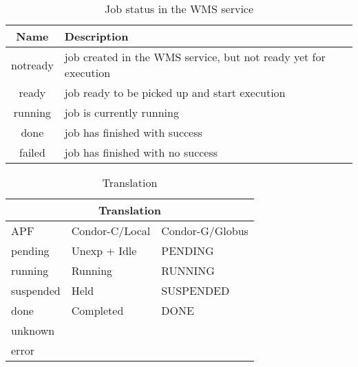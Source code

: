\documentclass[a4paper]{jpconf}
\begin{document}
\begin{table}
\begin{tabular}{|c|l|}
\hline
\hline
Name & Description\tabularnewline
\hline
\hline
notready &     job created in the WMS service, but not ready yet for execution\\ \hline
ready    &     job ready to be picked up and start execution                  \\ \hline
running  &     job is currently running                                       \\ \hline
done     &     job has finished with success                                  \\ \hline
failed   &     job has finished with no success                               \\ \hline
\end{tabular}\caption{Job status in the WMS service}
\label{wms job status}
\end{table}



\begin{table}
\begin{tabular}{|l|l|l|}
\hline
\hline
\multicolumn{3}{|c|}{Translation} \\
\hline
\hline
APF         &      Condor-C/Local      &        Condor-G/Globus \\ \hline 
\hline
\hline
pending     &      Unexp + Idle        &        PENDING         \\ \hline 
running     &      Running             &        RUNNING         \\ \hline 
suspended   &      Held                &        SUSPENDED       \\ \hline 
done        &      Completed           &        DONE            \\ \hline
unknown     &                          &                        \\ \hline    
error       &                          &                        \\ \hline
\end{tabular}\caption{Translation}
\label{translation}
\end{table}
\end{document}
